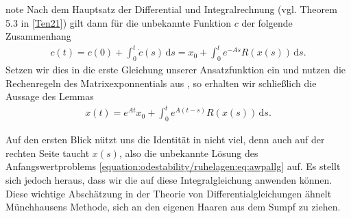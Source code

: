 \documentclass[letterpaper,10pt,german]{jupyterBook}
\begin{document}
\begin{sphinxadmonition}{note}
\sphinxAtStartPar
Nach dem Hauptsatz der Differential\sphinxhyphen{} und Integralrechnung (vgl. Theorem 5.3 in {[}\hyperlink{cite.references:id15}{Ten21}{]}) gilt dann für die unbekannte Funktion \(c\) der folgende Zusammenhang
\begin{equation*}
\begin{split}c(t) = c(0) + \int_0^t \dot{c}(s)\, \mathrm{d}s = x_0+ \int_0^t e^{-As}R(x(s)) \, \mathrm{d}s.\end{split}
\end{equation*}
\sphinxAtStartPar
Setzen wir dies in die erste Gleichung unserer Ansatzfunktion ein und nutzen die Rechenregeln des Matrixexponnentials aus {\hyperref[\detokenize{ode/repetition:rem:matrixexponentialregeln}]{}}, so erhalten wir schließlich die Aussage des Lemmas
\begin{equation*}
\begin{split}x(t) = e^{At}x_0+ \int_0^t e^{A(t-s)}R(x(s)) \, \mathrm{d}s.\end{split}
\end{equation*}\end{sphinxadmonition}

\sphinxAtStartPar
Auf den ersten Blick nützt uns die Identität in {\hyperref[\detokenize{odestability/ruhelagen:lem:intexpglgn}]{}} nicht viel, denn auch auf der rechten Seite taucht \(x(s)\), also die unbekannte Lösung des Anfangswertproblems \eqref{equation:odestability/ruhelagen:eq:awpallg} auf.
Es stellt sich jedoch heraus, dass wir die  auf diese Integralgleichung anwenden können.
Diese wichtige Abschätzung in der Theorie von Differentialgleichungen ähnelt Münchhausens Methode, sich an den eigenen Haaren aus dem Sumpf zu ziehen.
\end{document}
